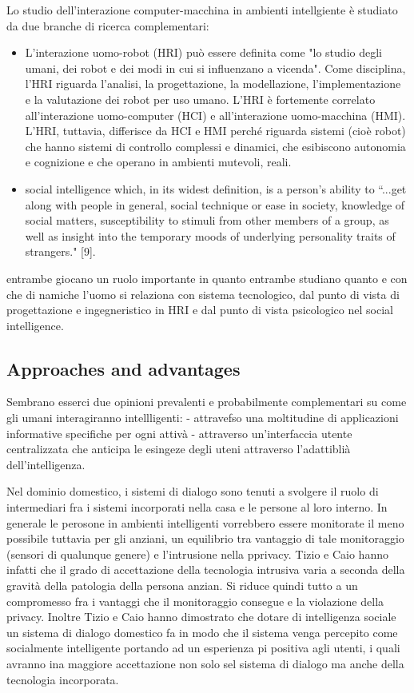 \documentclass{thesisreport}
\begin{document}
 Lo studio dell'interazione computer-macchina in ambienti intellgiente è studiato da due branche di ricerca complementari: 
 \begin{itemize}
     \item L'interazione uomo-robot (HRI) può essere definita come "lo studio degli umani, dei robot e dei modi in cui si influenzano a vicenda". Come disciplina, l'HRI riguarda l'analisi, la progettazione, la modellazione, l'implementazione e la valutazione dei robot per uso umano.
     L'HRI è fortemente correlato all'interazione uomo-computer (HCI) e all'interazione uomo-macchina (HMI). L'HRI, tuttavia, differisce da HCI e HMI perché riguarda sistemi (cioè robot) che hanno sistemi di controllo complessi e dinamici, che esibiscono autonomia e cognizione e che operano in ambienti mutevoli, reali.
     
     \item social intelligence which, in its widest definition, is a person's ability to ``...get along with people in general, social technique or ease in society, knowledge of social matters, susceptibility to stimuli from other members of a group, as well as insight into the temporary moods of underlying personality traits of strangers." [9]. 
 \end{itemize}

 entrambe giocano un ruolo importante in quanto entrambe studiano quanto e con che di namiche l'uomo si relaziona con sistema tecnologico, dal punto di vista di progettazione e ingegneristico in HRI e dal punto di vista psicologico nel social intelligence. 
 
 \subsection{Approaches and advantages}
 Sembrano esserci due opinioni prevalenti e probabilmente complementari su come gli umani interagiranno intellligenti: 
 - attravefso una moltitudine di applicazioni informative specifiche per ogni attivà 
 - attraverso un'interfaccia utente centralizzata che anticipa le esingeze degli uteni attraverso l'adattiblià dell'intelligenza. 
 
 Nel dominio domestico, i sistemi di dialogo sono tenuti a svolgere il ruolo di intermediari fra i sistemi incorporati nella casa e le persone al loro interno. 
 In generale le perosone in ambienti intelligenti vorrebbero essere monitorate il meno possibile tuttavia per gli anziani, un equilibrio tra vantaggio di tale monitoraggio (sensori di qualunque genere) e l'intrusione nella pprivacy. Tizio e Caio hanno infatti che il grado di accettazione della tecnologia intrusiva varia a seconda della gravità della patologia della persona anzian. Si riduce quindi tutto a un compromesso fra i vantaggi che il monitoraggio consegue e la violazione della privacy. 
 Inoltre  Tizio e Caio hanno dimostrato che dotare di intelligenza sociale un sistema di dialogo domestico fa in modo che il sistema venga percepito come socialmente intelligente portando ad un esperienza pi positiva agli utenti, i quali avranno ina maggiore accettazione non solo sel sistema di dialogo ma anche della tecnologia incorporata.
 
\end{document}
